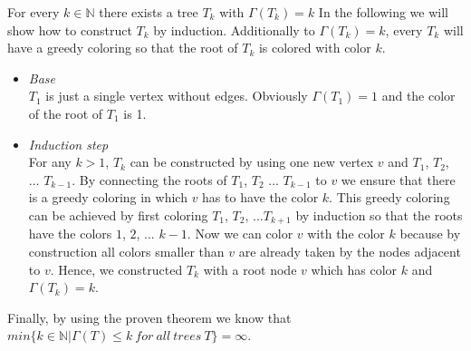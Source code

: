 \documentclass[a4paper]{article}
\begin{document}
	\begin{solution}{29}
		\begin{theorem}{For every $k \in \mathbb{N} $ there exists a tree $T_k$ with $\Gamma (T_k) = k$}
			In the following we will show how to construct $T_k$ by induction. 
			Additionally to $\Gamma (T_k) = k$, every $T_k$ will have a greedy coloring so that the root of $T_k$ is colored with color $k$.  
			\begin{itemize}
				\item \emph{Base} \\
					$T_1$ is just a single vertex without edges. Obviously $\Gamma (T_1) = 1$ and the color of the root of $T_1$ is 1.
				\item \emph{Induction step} \\
					For any $k > 1$, $T_k$ can be constructed by using one new vertex $v$ and $T_1$, $T_2$, ... $T_{k-1}$. 
					By connecting the roots of $T_1$, $T_2$ ... $T_{k-1}$ to $v$ we ensure that there is a greedy coloring in which $v$ has to have the color $k$. 
					This greedy coloring can be achieved by first coloring $T_1$, $T_2$, ...$T_{k+1}$ by induction so that the roots have the colors $1$, $2$, ... $k-1$. 
					Now we can color $v$ with the color $k$ because by construction all colors smaller than $v$ are already taken by the nodes adjacent to $v$. 
					Hence, we constructed $T_k$ with a root node $v$ which has color $k$ and $\Gamma (T_k) = k$. 
			\end{itemize}
		\end{theorem}
		Finally, by using the proven theorem we know that $min\{k \in \mathbb{N} | \Gamma(T) \leq k\ for\ all\ trees\ T\} = \infty$. 
		

\end{solution}
\end{document}
